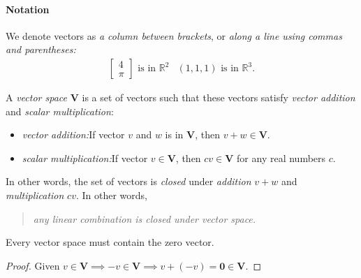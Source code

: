 \paragraph{Notation} We denote vectors as \textit{a
column between brackets}, or \textit{along a line using commas and parentheses:}
\[
\begin{array}{ll}
\begin{bmatrix}
4\\\pi
\end{bmatrix}
\mbox{ is in $\mathbb{R}^{2}$}
&
(1,1,1)
\mbox{ is in $\mathbb{R}^{3}.$}
\end{array}
\]
\begin{definition}
A \emph{vector space} $\bm V$ is a set of vectors such that these vectors satisfy \textit{vector addition} and \textit{scalar multiplication}:
\begin{itemize}
\item
\emph{vector addition:}If vector $v$ and $w$ is in $\bm V$, then $v+w\in \bm V.$
\item
\emph{scalar multiplication:}If vector $v\in \bm V$, then $cv\in \bm V$ for any real numbers $c$.
\end{itemize}
\end{definition}
In other words, the set of vectors is \emph{closed} under \textit{addition} $v + w$ and \textit{multiplication} $cv$. In other words, 
\begin{quotation}
\emph{any linear combination is closed under vector space.}
\end{quotation}
\begin{proposition}
Every vector space must contain the zero vector.
\end{proposition}
\begin{proof}
Given $v\in\bm V\implies -v\in\bm V\implies v+(-v) = \bm 0\in \bm V.$
\end{proof}

